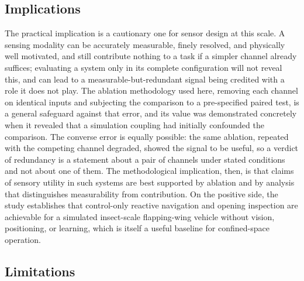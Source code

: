 \documentclass[final,5p,times]{elsarticle}
\begin{document}
\subsection{Implications}
\label{sec:disc_implications}

The practical implication is a cautionary one for sensor design at this scale. A sensing modality can be accurately measurable, finely resolved, and physically well motivated, and still contribute nothing to a task if a simpler channel already suffices; evaluating a system only in its complete configuration will not reveal this, and can lead to a measurable-but-redundant signal being credited with a role it does not play. The ablation methodology used here, removing each channel on identical inputs and subjecting the comparison to a pre-specified paired test, is a general safeguard against that error, and its value was demonstrated concretely when it revealed that a simulation coupling had initially confounded the comparison. The converse error is equally possible: the same ablation, repeated with the competing channel degraded, showed the signal to be useful, so a verdict of redundancy is a statement about a pair of channels under stated conditions and not about one of them. The methodological implication, then, is that claims of sensory utility in such systems are best supported by ablation and by analysis that distinguishes measurability from contribution. On the positive side, the study establishes that control-only reactive navigation and opening inspection are achievable for a simulated insect-scale flapping-wing vehicle without vision, positioning, or learning, which is itself a useful baseline for confined-space operation.

\subsection{Limitations}
\label{sec:disc_limitations}
\end{document}
